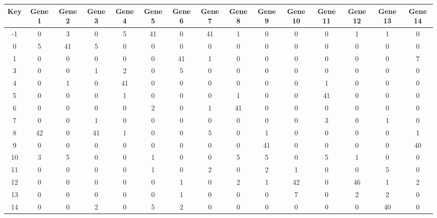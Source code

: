 \begin{tabular}{|c|c|c|c|c|c|c|c|c|c|c|c|c|c|c|}
\hline
Key & Gene 1 & Gene 2 & Gene 3 & Gene 4 & Gene 5 & Gene 6 & Gene 7 & Gene 8 & Gene 9 & Gene 10 & Gene 11 & Gene 12 & Gene 13 & Gene 14 \\
\hline
-1 & 0 & 3 & 0 & 5 & 41 & 0 & 41 & 1 & 0 & 0 & 0 & 1 & 1 & 0 \\
0 & 5 & 41 & 5 & 0 & 0 & 0 & 0 & 0 & 0 & 0 & 0 & 0 & 0 & 0 \\
1 & 0 & 0 & 0 & 0 & 0 & 41 & 1 & 0 & 0 & 0 & 0 & 0 & 0 & 7 \\
3 & 0 & 0 & 1 & 2 & 0 & 5 & 0 & 0 & 0 & 0 & 0 & 0 & 0 & 0 \\
4 & 0 & 1 & 0 & 41 & 0 & 0 & 0 & 0 & 0 & 0 & 1 & 0 & 0 & 0 \\
5 & 0 & 0 & 0 & 1 & 0 & 0 & 0 & 1 & 0 & 0 & 41 & 0 & 0 & 0 \\
6 & 0 & 0 & 0 & 0 & 2 & 0 & 1 & 41 & 0 & 0 & 0 & 0 & 0 & 0 \\
7 & 0 & 0 & 1 & 0 & 0 & 0 & 0 & 0 & 0 & 0 & 3 & 0 & 1 & 0 \\
8 & 42 & 0 & 41 & 1 & 0 & 0 & 5 & 0 & 1 & 0 & 0 & 0 & 0 & 1 \\
9 & 0 & 0 & 0 & 0 & 0 & 0 & 0 & 0 & 41 & 0 & 0 & 0 & 0 & 40 \\
10 & 3 & 5 & 0 & 0 & 1 & 0 & 0 & 5 & 5 & 0 & 5 & 1 & 0 & 0 \\
11 & 0 & 0 & 0 & 0 & 1 & 0 & 2 & 0 & 2 & 1 & 0 & 0 & 5 & 0 \\
12 & 0 & 0 & 0 & 0 & 0 & 1 & 0 & 2 & 1 & 42 & 0 & 46 & 1 & 2 \\
13 & 0 & 0 & 0 & 0 & 0 & 1 & 0 & 0 & 0 & 7 & 0 & 2 & 2 & 0 \\
14 & 0 & 0 & 2 & 0 & 5 & 2 & 0 & 0 & 0 & 0 & 0 & 0 & 40 & 0 \\
\hline
\end{tabular}